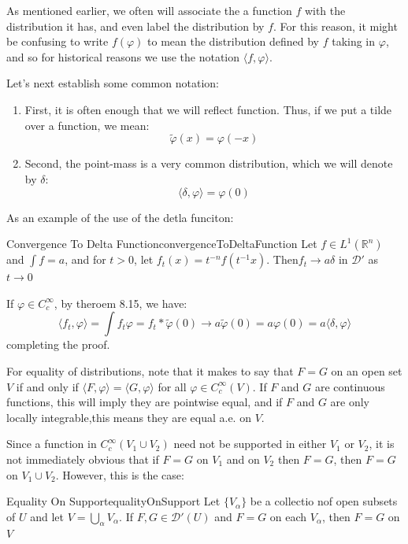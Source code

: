 \documentclass{book}
\newenvironment{Proof}[1][]
  {\begin{ProofTcb}[#1]}
  {\end{ProofTcb}}
\newcommand{\R}{{\mathbb{R}}}
\newcommand{\CD}{{\mathcal{D}}}
\renewcommand{\phi}{\varphi}
\newcommand{\rw}{\rightarrow}
\begin{document}
As mentioned earlier, we often will associate the a function $f$ with the distribution it has, and even label the
distribution by $f$. For this reason, it might be confusing to write $f(\phi)$ to mean the distribution defined by $f$
taking in $\phi$, and so for historical reasons we use the notation $\langle f, \phi\rangle$.

Let's next establish some common notation:
\begin{enumerate}
	\item First, it is often enough that we will reflect function. Thus, if we put a tilde over a function, we mean:
		\[
			\tilde{\phi}(x) = \phi(-x)
		\]
	\item Second, the point-mass is a very common distribution, which we will denote by $\delta$:
		\[
			\langle \delta, \phi\rangle = \phi(0)
		\]
\end{enumerate}

As an example of the use of the detla funciton:

\begin{prop}{Convergence To Delta Function}{convergenceToDeltaFunction}
	Let $f \in L^1(\R^n)$ and $\int f = a$, and for $t > 0$, let $f_t(x) = t^{-n}f(t^{-1}x)$. Then$f_t \rw a\delta$ in
	$\CD'$ as $t \rw 0$
\end{prop}

\begin{Proof}
	If $\phi \in C_c^\infty$, by theroem 8.15, we have:
	\[
		\langle f_t, \phi\rangle = \int f_t\phi = f_t * \tilde{\phi}(0) \rw a\tilde{\phi}(0) = a\phi(0) = a\langle
		\delta, \phi\rangle
	\]
	completing the proof.
\end{Proof}

For equality of distributions, note that it makes to say that $F = G$ on an open set $V$ if and only if $\langle F,
\phi\rangle = \langle G,\phi\rangle$ for all $\phi \in C_c^\infty(V)$. If $F$ and $G$ are continuous functions, this will
imply they are pointwise equal, and if $F$ and $G$ are only locally integrable,this means they are equal a.e. on $V$.

Since a function in $C_c^\infty(V_1\cup V_2)$ need not be supported in either $V_1$ or $V_2$, it is not immediately
obvious that if $F = G$ on $V_1$ and on $V_2$ then $F = G$, then $F = G$ on $V_1\cup V_2$. However, this is the case:

\begin{prop}{Equality On Support}{equalityOnSupport}
	Let $\{V_\alpha\}$ be a collectio nof open subsets of $U$ and let $V = \bigcup_\alpha V_\alpha$. If $F,G \in
	\CD'(U)$ and $F = G$ on each $V_\alpha$, then $F = G$ on $V$
\end{prop}
\end{document}
